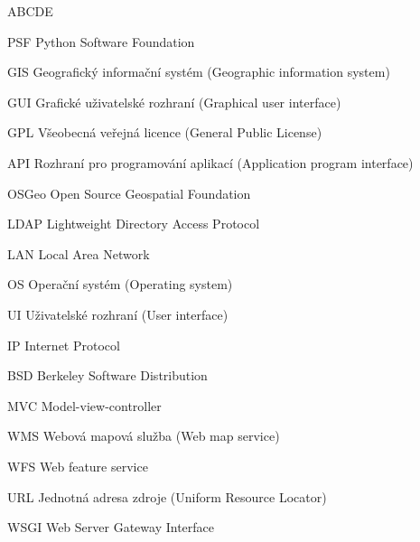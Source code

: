 
\begin{seznamzkratek}{ABCDE}      
	      
		  {PSF}
	      {Python Software Foundation}

	      {GIS}
	      {Geografický informační systém (Geographic information system)}
	         
	      {GUI}
	      {Grafické uživatelské rozhraní (Graphical user interface)}

	      {GPL}
	      {Všeobecná veřejná licence (General Public License)}
	      
	      {API}
	      {Rozhraní pro programování aplikací (Application program interface)}	      
	    
	      {OSGeo}
	      {Open Source Geospatial Foundation}
	      
	      {LDAP}
	      {Lightweight Directory Access Protocol} 
	      
	      {LAN}
	      {Local Area Network} 
	      	       
	      {OS}
	      {Operační systém (Operating system)} 

	      {UI}
	      {Uživatelské rozhraní (User interface)} 
	      
	      {IP}
	      {Internet Protocol} 	      	     

	      {BSD}
	      {Berkeley Software Distribution} 	

	      {MVC}
	      {Model-view-controller} 	

	      {WMS}
	      {Webová mapová služba (Web map service)} 	

	      {WFS}
	      {Web feature service} 	

	      {URL}
	      {Jednotná adresa zdroje (Uniform Resource Locator)}

	      {WSGI}
	      {Web Server Gateway Interface}

\end{seznamzkratek}